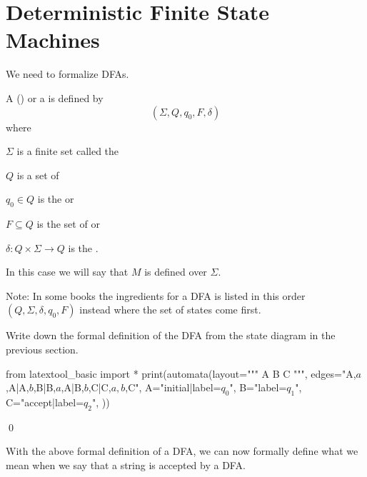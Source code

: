 \section{Deterministic Finite State Machines}

We need to formalize DFAs.

\begin{defn}
  A 
  (\sidebarskip{16pt})
  or a
  \sidebarskip{8pt}\sidebarskip{4pt}
  is defined by
  \[
  (\Sigma,Q,q_0,F,\delta)
  \]
  where
  \begin{tightlist}
  \item $\Sigma$ is a finite set called the
  \item $Q$ is a set of 
  \item $q_0 \in Q$ is the
    or
    \sidebarskip{12pt}
  \item $F \subseteq Q$ is the set of 
    or
    \sidebarskip{18pt}
  \item $\delta : Q \times \Sigma \rightarrow Q$ is the
    .
  \end{tightlist}
  In this case we will say that $M$ is defined over $\Sigma$.
\end{defn}

Note: In some books the ingredients
for a DFA is listed in this order $(Q, \Sigma, \delta, q_0, F)$
instead where the set of states come first.


\newpage
\begin{ex}
  Write down the formal definition of the DFA from the
  state diagram in the previous section.
\begin{python}
from latextool_basic import *
print(automata(layout="""
A  B  C
""",
edges="A,$a$,A|A,$b$,B|B,$a$,A|B,$b$,C|C,$a,b$,C",
A="initial|label=$q_0$",
B="label=$q_1$",
C="accept|label=$q_2$",
))
\end{python}
\qed
\end{ex}


\newpage
With the above formal definition of a DFA, we can now formally
define what we mean when we say that a string is accepted by a
DFA.


